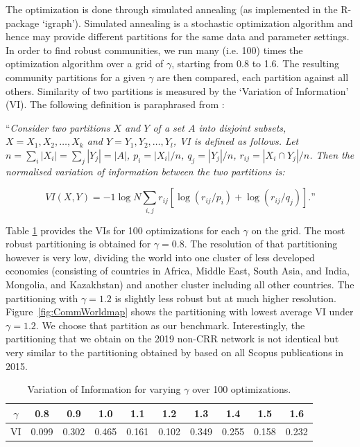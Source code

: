 The optimization is done through simulated annealing (as implemented in the R-package `igraph'). Simulated annealing is a stochastic optimization algorithm and hence may provide different partitions for the same data and parameter settings. In order to find robust communities,  we run many (i.e. 100) times the optimization algorithm over a grid of $\gamma$, starting from 0.8 to 1.6. The resulting community partitions for a given $\gamma$ are then compared, each partition against all others. Similarity of two partitions is measured by the `Variation of Information' (VI). The following definition is paraphrased from \citep[][Appendix 4]{FitzgeraldEtAl2021}:

``\textit{Consider two partitions $X$ and $Y$ of a set $A$ into disjoint subsets, $X={X_1,X_2,\ldots,X_k}$ and $Y={Y_1,Y_2,\ldots,Y_l}$, VI is defined as follows. Let $n=\sum_i |X_i|=\sum_j |Y_j|=|A|$, $p_i=|X_i| / n$, $q_j = |Y_j| / n$, $r_{ij}=| X_i \cap Y_j| / n$. Then the normalised variation of information between the two partitions is:}

\begin{equation*}
	VI(X,Y) = - 1 \log N \sum_{i,j} r_{ij} \left[ \log(r_{ij}/p_i) + \log(r_{ij}/q_j) \right] \text{.''}
\end{equation*}
 
Table \ref{tab:VI} provides the VIs for 100 optimizations for each $\gamma$ on the grid. The most robust partitioning is obtained for $\gamma=0.8$. The resolution of that partitioning however is very low, dividing the world into one cluster of less developed economies (consisting of countries in Africa, Middle East, South Asia, and India, Mongolia, and Kazakhstan) and another cluster including all other countries. The partitioning with $\gamma=1.2$ is slightly less robust but at much higher resolution. Figure~\ref{fig:CommWorldmap} shows the partitioning with lowest average VI under $\gamma=1.2$. We choose that partition as our benchmark. Interestingly, the partitioning that we obtain on the 2019 non-CRR network is not identical but very similar to the partitioning obtained by \citet[][Fig.5b]{FitzgeraldEtAl2021} based on all Scopus publications in 2015. 



\begin{table}[ht]
\caption{Variation of Information for varying $\gamma$ over 100 optimizations.}
\label{tab:VI}
\centering
\begin{tabular}{cccccccccc}
  \hline
$\gamma$ & 0.8 & 0.9 & 1.0 & 1.1 & 1.2 & 1.3 & 1.4 & 1.5 & 1.6 \\ 
    \hline
VI & 0.099 & 0.302 & 0.465 & 0.161 & 0.102 & 0.349 & 0.255 & 0.158 & 0.232 \\ 
\hline
\end{tabular}
\end{table}


